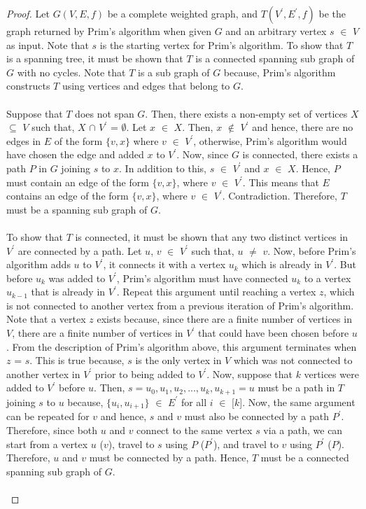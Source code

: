 \documentclass[12pt]{article}
\numberwithin{equation}{subsection}
\numberwithin{table}{subsection}
\begin{document}
\begin{proof}
Let $G(V,E,f)$ be a complete weighted graph, and $T(V^\prime,E^\prime,f)$ be the graph returned by Prim's algorithm when given $G$ and an arbitrary vertex $s$ $\in$ $V$ as input. Note that $s$ is the starting vertex for Prim's algorithm. To show that $T$ is a spanning tree, it must be shown that $T$ is a connected spanning sub graph of $G$ with no cycles. Note that $T$ is a sub graph of $G$ because, Prim's algorithm constructs $T$ using vertices and edges that belong to $G$.\\\\
Suppose that $T$ does not span $G$. Then, there exists a non-empty set of vertices $X$ $\subseteq$ $V$ such that, $X$ $\cap$ $V^\prime$ = $\emptyset$. Let $x$ $\in$ $X$. Then, $x$ $\notin$ $V^\prime$ and hence, there are no edges in $E$ of the form $\{v,x\}$ where $v$ $\in$ $V^\prime$, otherwise, Prim's algorithm would have chosen the edge and added $x$ to $V^\prime$. Now, since $G$ is connected, there exists a path $P$ in $G$ joining $s$ to $x$. In addition to this, $s$ $\in$ $V^\prime$ and $x$ $\in$ $X$. Hence, $P$ must contain an edge of the form $\{v, x\}$, where $v$ $\in$ $V^\prime$. This means that $E$ contains an edge of the form $\{v, x\}$, where $v$ $\in$ $V^\prime$. Contradiction. Therefore, $T$ must be a spanning sub graph of $G$.\\\\
To show that $T$ is connected, it must be shown that any two distinct vertices in $V^\prime$ are connected by a path. Let $u$, $v$ $\in$ $V^\prime$ such that, $u$ $\neq$ $v$. Now, before Prim's algorithm adds $u$ to $V^\prime$, it connects it with a vertex $u_k$ which is already in $V^\prime$. But before $u_k$ was added to $V^\prime$, Prim's algorithm must have connected $u_k$ to a vertex $u_{k-1}$ that is already in $V^\prime$. Repeat this argument until reaching a vertex $z$, which is not connected to another vertex from a previous iteration of Prim's algorithm. Note that a vertex $z$ exists because, since there are a finite number of vertices in $V$, there are a finite number of vertices in $V^\prime$ that could have been chosen before $u$. From the description of Prim's algorithm above, this argument terminates when $z$ = $s$. This is true because, $s$ is the only vertex in $V$ which was not connected to another vertex in $V^\prime$ prior to being added to $V^\prime$. Now, suppose that $k$ vertices were added to $V^\prime$ before $u$. Then, $s= u_0, u_1, u_2, ..., u_k, u_{k+1} = u$ must be a path in $T$ joining $s$ to $u$ because, $\{u_i, u_{i+1}\}$ $\in$ $E^\prime$ for all $i$ $\in$ [$k$]. Now, the same argument can be repeated for $v$ and hence, $s$ and $v$ must also be connected by a path $P^\prime$. Therefore, since both $u$ and $v$ connect to the same vertex $s$ via a path, we can start from a vertex $u$ ($v$), travel to $s$ using $P$ ($P^\prime$), and travel to $v$ using $P^\prime$ ($P$). Therefore, $u$ and $v$ must be connected by a path. Hence, $T$ must be a connected spanning sub graph of $G$.\\\\

\end{proof}
\end{document}
